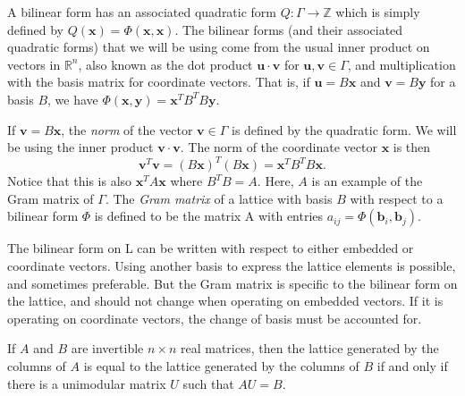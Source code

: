 A bilinear form has an associated quadratic form $Q: \Gamma \to \mathbb{Z}$ which is simply defined by $Q(\mathbf{x}) = \Phi(\mathbf{x}, \mathbf{x})$. The bilinear forms (and their associated quadratic forms) that we will be using come from the usual inner product on vectors in $\mathbb{R}^n$, also known as the dot product $\mathbf{u}\cdot \mathbf{v}$ for $\mathbf{u},\mathbf{v} \in \Gamma$, and multiplication with the basis matrix for coordinate vectors. That is, if $\mathbf{u} = B\mathbf{x}$ and $\mathbf{v} = B\mathbf{y}$ for a basis $B$, we have $\Phi(\mathbf{x},\mathbf{y}) = \mathbf{x}^TB^TB\mathbf{y}$. 

If $\mathbf{v} = B\mathbf{x}$, the \textit{norm} of the vector $\mathbf{v} \in \Gamma$ is defined by the quadratic form. We will be using the inner product $\mathbf{v} \cdot \mathbf{v}$. The norm of the coordinate vector $\mathbf{x}$ is then 
\[\mathbf{v}^T\mathbf{v} = (B\mathbf{x})^T(B\mathbf{x}) = \mathbf{x}^TB^TB\mathbf{x}.\]
Notice that this is also $\mathbf{x}^TA\mathbf{x}$ where $B^TB = A$. Here, $A$ is an example of the Gram matrix of $\Gamma$. The \textit{Gram matrix} of a lattice with basis $B$ with respect to a bilinear form $\Phi$ is defined to be the matrix A with entries $a_{ij} = \Phi(\mathbf{b}_i,\mathbf{b}_j)$.

The bilinear form on L can be written with respect to either embedded or coordinate vectors. Using another basis to express the lattice elements is possible, and sometimes preferable. But the Gram matrix is specific to the bilinear form on the lattice, and should not change when operating on embedded vectors. If it is operating on coordinate vectors, the change of basis must be accounted for.

If $A$ and $B$ are invertible $n \times n$ real matrices, then the lattice generated by the columns of $A$ is equal to the lattice generated by the columns of $B$ if and only if there is a unimodular matrix $U$ such that $AU = B$. 




\endinput

Any text after an \endinput is ignored.
You could put scraps here or things in progress.